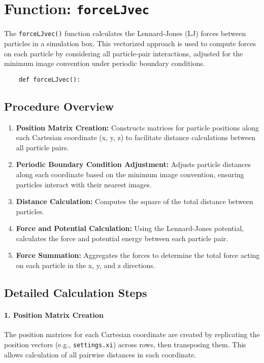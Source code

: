 \documentclass[12pt, ngerman]{report}
\begin{document}
\section{Function: \texttt{forceLJvec}}
\label{sec:forceLJvec}

The \texttt{forceLJvec()} function calculates the Lennard-Jones (LJ) forces between particles in a simulation box. This vectorized approach is used to compute forces on each particle by considering all particle-pair interactions, adjusted for the minimum image convention under periodic boundary conditions.

\begin{verbatim}
	def forceLJvec():
\end{verbatim}

\subsection*{Procedure Overview}
\begin{enumerate}
	\item \textbf{Position Matrix Creation:} Constructs matrices for particle positions along each Cartesian coordinate (x, y, z) to facilitate distance calculations between all particle pairs.
	\item \textbf{Periodic Boundary Condition Adjustment:} Adjusts particle distances along each coordinate based on the minimum image convention, ensuring particles interact with their nearest images.
	\item \textbf{Distance Calculation:} Computes the square of the total distance between particles.
	\item \textbf{Force and Potential Calculation:} Using the Lennard-Jones potential, calculates the force and potential energy between each particle pair.
	\item \textbf{Force Summation:} Aggregates the forces to determine the total force acting on each particle in the x, y, and z directions.
\end{enumerate}

\subsection*{Detailed Calculation Steps}

\paragraph{1. Position Matrix Creation}
The position matrices for each Cartesian coordinate are created by replicating the position vectors (e.g., \texttt{settings.xi}) across rows, then transposing them. This allows calculation of all pairwise distances in each coordinate.
\end{document}
